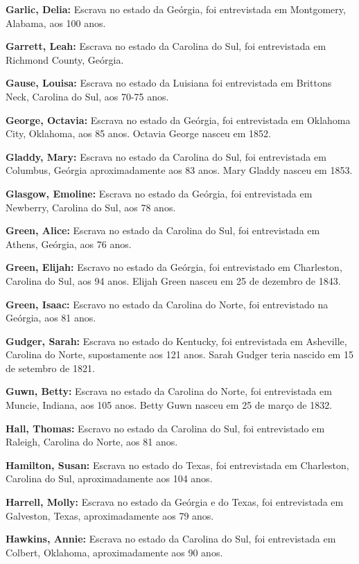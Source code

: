 \textbf{Garlic, Delia:} Escrava no estado da Geórgia, foi entrevistada
em Montgomery, Alabama, aos 100 anos.

\textbf{Garrett, Leah:} Escrava no estado da Carolina do Sul, foi
entrevistada em Richmond County, Geórgia.

\textbf{Gause, Louisa:} Escrava no estado da Luisiana foi entrevistada
em Brittons Neck, Carolina do Sul, aos 70-75 anos.

\textbf{George, Octavia:} Escrava no estado da Geórgia, foi entrevistada
em Oklahoma City, Oklahoma, aos 85 anos. Octavia George nasceu em 1852.

\textbf{Gladdy, Mary:} Escrava no estado da Carolina do Sul, foi
entrevistada em Columbus, Geórgia aproximadamente aos 83 anos. Mary
Gladdy nasceu em 1853.

\textbf{Glasgow, Emoline:} Escrava no estado da Geórgia, foi
entrevistada em Newberry, Carolina do Sul, aos 78 anos.

\textbf{Green, Alice:} Escrava no estado da Carolina do Sul, foi
entrevistada em Athens, Geórgia, aos 76 anos.

\textbf{Green, Elijah:} Escravo no estado da Geórgia, foi entrevistado
em Charleston, Carolina do Sul, aos 94 anos. Elijah Green nasceu em 25
de dezembro de 1843.

\textbf{Green, Isaac:} Escravo no estado da Carolina do Norte, foi
entrevistado na Geórgia, aos 81 anos.

\textbf{Gudger, Sarah:} Escrava no estado do Kentucky, foi entrevistada
em Asheville, Carolina do Norte, supostamente aos 121 anos. Sarah Gudger
teria nascido em 15 de setembro de 1821.

\textbf{Guwn, Betty:} Escrava no estado da Carolina do Norte, foi
entrevistada em Muncie, Indiana, aos 105 anos. Betty Guwn nasceu em 25
de março de 1832.

\textbf{Hall, Thomas:} Escravo no estado da Carolina do Sul, foi
entrevistado em Raleigh, Carolina do Norte, aos 81 anos.

\textbf{Hamilton, Susan:} Escrava no estado do Texas, foi entrevistada
em Charleston, Carolina do Sul, aproximadamente aos 104 anos.

\textbf{Harrell, Molly:} Escrava no estado da Geórgia e do Texas, foi
entrevistada em Galveston, Texas, aproximadamente aos 79 anos.

\textbf{Hawkins, Annie:} Escrava no estado da Carolina do Sul, foi
entrevistada em Colbert, Oklahoma, aproximadamente aos 90 anos.

